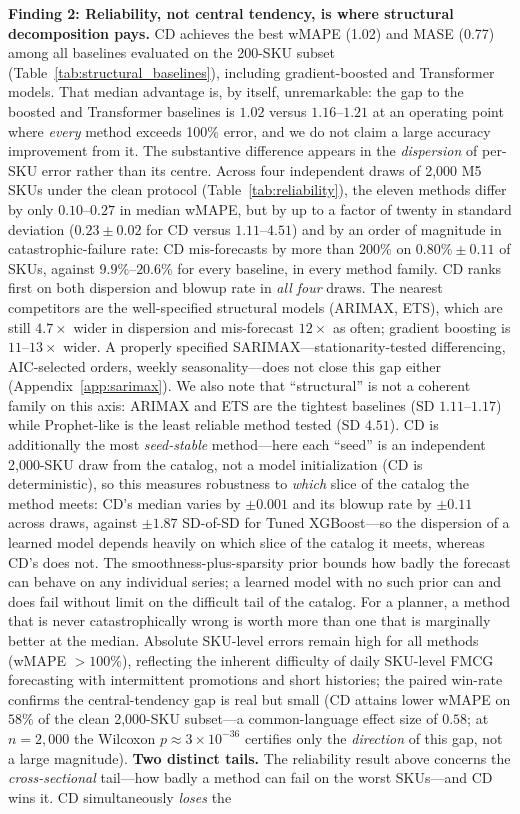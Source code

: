 \documentclass[10pt]{article} %
\theoremstyle{plain}
\theoremstyle{definition}
\begin{document}
\textbf{Finding 2: Reliability, not central tendency, is where structural decomposition pays.} CD achieves the best wMAPE (1.02) and MASE (0.77) among all baselines evaluated on the 200-SKU subset (Table~\ref{tab:structural_baselines}), including gradient-boosted and Transformer models. That median advantage is, by itself, unremarkable: the gap to the boosted and Transformer baselines is $1.02$ versus $1.16$--$1.21$ at an operating point where \emph{every} method exceeds 100\% error, and we do not claim a large accuracy improvement from it. The substantive difference appears in the \emph{dispersion} of per-SKU error rather than its centre. Across four independent draws of 2{,}000 M5 SKUs under the clean protocol (Table~\ref{tab:reliability}), the eleven methods differ by only $0.10$--$0.27$ in median wMAPE, but by up to a factor of twenty in standard deviation ($0.23 \pm 0.02$ for CD versus $1.11$--$4.51$) and by an order of magnitude in catastrophic-failure rate: CD mis-forecasts by more than $200\%$ on $0.80\% \pm 0.11$ of SKUs, against $9.9\%$--$20.6\%$ for every baseline, in every method family. CD ranks first on both dispersion and blowup rate in \emph{all four} draws. The nearest competitors are the well-specified structural models (ARIMAX, ETS), which are still $4.7\times$ wider in dispersion and mis-forecast $12\times$ as often; gradient boosting is $11$--$13\times$ wider. A properly specified SARIMAX---stationarity-tested differencing, AIC-selected orders, weekly seasonality---does not close this gap either (Appendix~\ref{app:sarimax}). We also note that ``structural'' is not a coherent family on this axis: ARIMAX and ETS are the tightest baselines (SD $1.11$--$1.17$) while Prophet-like is the least reliable method tested (SD $4.51$). CD is additionally the most \emph{seed-stable} method---here each ``seed'' is an independent 2{,}000-SKU draw from the catalog, not a model initialization (CD is deterministic), so this measures robustness to \emph{which} slice of the catalog the method meets: CD's median varies by $\pm 0.001$ and its blowup rate by $\pm 0.11$ across draws, against $\pm 1.87$ SD-of-SD for Tuned XGBoost---so the dispersion of a learned model depends heavily on which slice of the catalog it meets, whereas CD's does not. The smoothness-plus-sparsity prior bounds how badly the forecast can behave on any individual series; a learned model with no such prior can and does fail without limit on the difficult tail of the catalog. For a planner, a method that is never catastrophically wrong is worth more than one that is marginally better at the median. Absolute SKU-level errors remain high for all methods (wMAPE $> 100\%$), reflecting the inherent difficulty of daily SKU-level FMCG forecasting with intermittent promotions and short histories; the paired win-rate confirms the central-tendency gap is real but small (CD attains lower wMAPE on $58\%$ of the clean 2{,}000-SKU subset---a common-language effect size of $0.58$; at $n = 2{,}000$ the Wilcoxon $p \approx 3 \times 10^{-36}$ certifies only the \emph{direction} of this gap, not a large magnitude). \textbf{Two distinct tails.} The reliability result above concerns the \emph{cross-sectional} tail---how badly a method can fail on the worst SKUs---and CD wins it. CD simultaneously \emph{loses} the 
\end{document}
